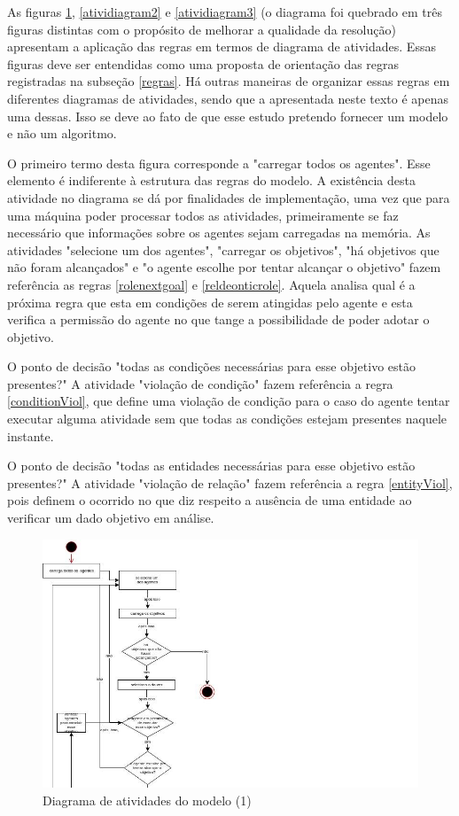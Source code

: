 As figuras \ref{atividiagram1}, \ref{atividiagram2} e \ref{atividiagram3} (o diagrama foi quebrado em três figuras distintas com o propósito de melhorar a qualidade da resolução)  apresentam a aplicação das regras em termos de diagrama de atividades. Essas figuras deve ser entendidas como uma proposta de orientação das regras registradas na subseção \ref{regras}. Há outras maneiras de organizar essas regras em diferentes diagramas de atividades, sendo que a apresentada neste texto é apenas uma dessas. Isso se deve ao fato de que esse estudo pretendo fornecer um modelo e não um algoritmo. 

O primeiro termo desta figura corresponde a "carregar todos os agentes". Esse elemento é indiferente à estrutura das regras do modelo. A existência desta atividade no diagrama se dá por finalidades de implementação, uma vez que para uma máquina poder processar todos as atividades, primeiramente se faz necessário que informações sobre os agentes sejam carregadas na memória. As atividades "selecione um dos agentes", "carregar os objetivos", "há objetivos que não foram alcançados" e "o agente escolhe por tentar alcançar o objetivo" fazem referência as regras \ref{rolenextgoal} e \ref{reldeonticrole}. Aquela analisa qual é a próxima regra que esta em condições de serem atingidas pelo agente e esta verifica a permissão do agente no que tange a possibilidade de poder adotar o objetivo. 

O ponto de decisão "todas as condições necessárias para esse objetivo estão presentes?" A atividade "violação de condição" fazem referência a regra \ref{conditionViol}, que define uma violação de condição para o caso do agente tentar executar alguma atividade sem que todas as condições estejam presentes naquele instante.

O ponto de decisão "todas as entidades necessárias para esse objetivo estão presentes?" A atividade "violação de relação" fazem referência a regra \ref{entityViol}, pois definem o ocorrido no que diz respeito a ausência de uma entidade ao verificar um dado objetivo em análise. 

\begin{figure}[H]
  \centering
  \includegraphics[width=1.1\linewidth]{figure/diag1.jpg} 
  \caption{Diagrama de atividades do modelo (1)}
  \label{atividiagram1}
\end{figure}


